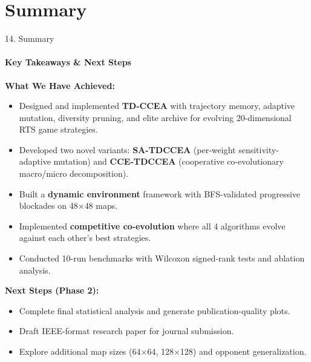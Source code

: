\documentclass[aspectratio=169, 11pt]{beamer}
\begin{document}
\section{Summary}
\begin{frame}{14. Summary}
    \framesubtitle{Key Takeaways \& Next Steps}

    \textbf{\textcolor{amritaMaroon}{What We Have Achieved:}}
    \begin{itemize}\small
        \item Designed and implemented \textbf{TD-CCEA} with trajectory memory, adaptive mutation, diversity pruning, and elite archive for evolving 20-dimensional RTS game strategies.
        \item Developed two novel variants: \textbf{SA-TDCCEA} (per-weight sensitivity-adaptive mutation) and \textbf{CCE-TDCCEA} (cooperative co-evolutionary macro/micro decomposition).
        \item Built a \textbf{dynamic environment} framework with BFS-validated progressive blockades on 48$\times$48 maps.
        \item Implemented \textbf{competitive co-evolution} where all 4 algorithms evolve against each other's best strategies.
        \item Conducted 10-run benchmarks with Wilcoxon signed-rank tests and ablation analysis.
    \end{itemize}

    \vspace{0.2cm}
    \textbf{\textcolor{amritaMaroon}{Next Steps (Phase 2):}}
    \begin{itemize}\small
        \item Complete final statistical analysis and generate publication-quality plots.
        \item Draft IEEE-format research paper for journal submission.
        \item Explore additional map sizes (64$\times$64, 128$\times$128) and opponent generalization.
    \end{itemize}
\end{frame}

\end{document}
